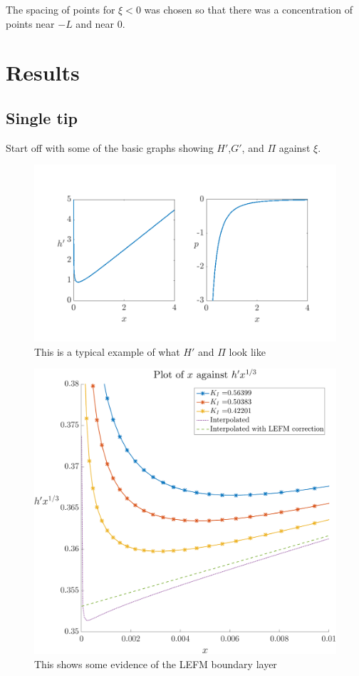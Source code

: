 \documentclass{jfm}
\begin{document}
The spacing of points for $\xi<0$ was chosen so that there was a concentration
of points near $-L$ and near $0$.

%
%
% 
\clearpage
\section{Results}\label{sec:Results}
%
%
%
\subsection{Single tip}
Start off with some of the basic graphs showing $H'$,$G'$, and $\Pi$ against
$\xi$.
\begin{figure}
  \centerline{\includegraphics[scale=0.3]{./../../Graphs/hprime-p-x-full.png}}
  \caption{This is a typical example of what $H'$ and $\Pi$ look like}
\end{figure}
\begin{figure}
  \centerline{\includegraphics[scale=0.3]{./../../Graphs/hprime-x.pdf}}
  \caption{This shows some evidence of the LEFM boundary layer}
\end{figure}
\end{document}
